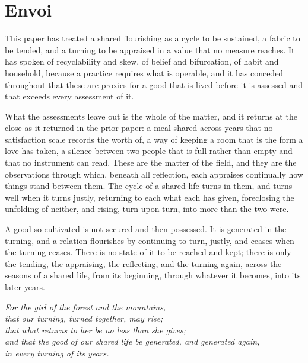 \section*{Envoi}
\label{p11:sec:envoi}

\noindent
This paper has treated a shared flourishing as a cycle to be sustained, a fabric to be tended, and a turning to be appraised in a value that no measure reaches. It has spoken of recyclability and skew, of belief and bifurcation, of habit and household, because a practice requires what is operable, and it has conceded throughout that these are proxies for a good that is lived before it is assessed and that exceeds every assessment of it.

What the assessments leave out is the whole of the matter, and it returns at the close as it returned in the prior paper: a meal shared across years that no satisfaction scale records the worth of, a way of keeping a room that is the form a love has taken, a silence between two people that is full rather than empty and that no instrument can read. These are the matter of the field, and they are the observations through which, beneath all reflection, each appraises continually how things stand between them. The cycle of a shared life turns in them, and turns well when it turns justly, returning to each what each has given, foreclosing the unfolding of neither, and rising, turn upon turn, into more than the two were.

A good so cultivated is not secured and then possessed. It is generated in the turning, and a relation flourishes by continuing to turn, justly, and ceases when the turning ceases. There is no state of it to be reached and kept; there is only the tending, the appraising, the reflecting, and the turning again, across the seasons of a shared life, from its beginning, through whatever it becomes, into its later years.

\begin{flushright}
\itshape\color{rose}
For the girl of the forest and the mountains,\\
that our turning, turned together, may rise;\\
that what returns to her be no less than she gives;\\
and that the good of our shared life be generated, and generated again,\\
in every turning of its years.
\end{flushright}

\bigskip
\begin{center}
\itshape\color{rose}
\end{center}
